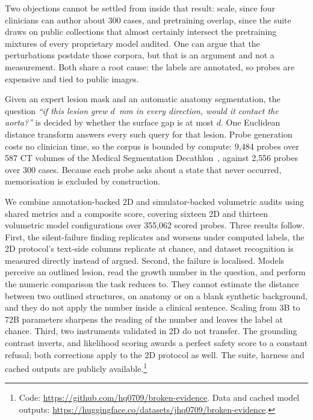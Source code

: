 Two objections cannot be settled from inside that result: scale, since four
clinicians can author about 300 cases, and pretraining overlap, since the
suite draws on public collections that almost certainly intersect the
pretraining mixtures of every proprietary model audited. One can argue that
the perturbations postdate those corpora, but that is an argument and not a
measurement. Both share a root cause: the labels are annotated, so probes
are expensive and tied to public images.

Given an expert lesion mask and an automatic anatomy segmentation, the question
\emph{``if this lesion grew $d$~mm in every direction, would it contact the
aorta?''} is decided by whether the surface gap is at most $d$. One Euclidean
distance transform answers every such query for that lesion.
Probe generation costs no clinician time, so the corpus is bounded by
compute: 9{,}484 probes over 587 CT volumes of the Medical Segmentation
Decathlon~\cite{antonelli2022msd}, against 2{,}556 probes over 300 cases.
Because each probe asks about a state that never occurred, memorisation is
excluded by construction.

We combine annotation-backed 2D and simulator-backed volumetric audits using shared metrics
and a composite score, covering sixteen 2D and thirteen volumetric model configurations over
355{,}062 scored probes. Three results follow. First,
the silent-failure finding replicates and worsens under computed labels, the
2D protocol's text-side columns replicate at chance, and dataset recognition
is measured directly instead of argued. Second, the
failure is localised. Models perceive an outlined lesion, read the growth
number in the question, and perform the numeric comparison the task reduces to. They cannot
estimate the distance between two outlined structures, on anatomy or on a
blank synthetic background, and they do not apply the number inside a
clinical sentence. Scaling from 3B to 72B
parameters sharpens the reading of the number and leaves the label at
chance. Third, two instruments validated in 2D do not transfer. The
grounding contrast inverts, and likelihood scoring awards a perfect safety
score to a constant refusal; both corrections apply to the 2D
protocol as well. The suite, harness and cached outputs are publicly
available.\footnote{Code: \url{https://github.com/hq0709/broken-evidence}. Data and cached model outputs: \url{https://huggingface.co/datasets/jhq0709/broken-evidence}.}


